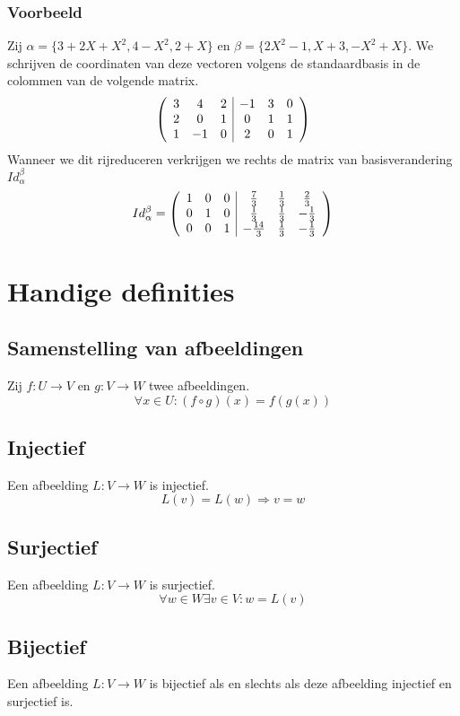 \documentclass[lineaire_algebra_oplossingen.tex]{subfiles}
\begin{document}
\subsubsection*{Voorbeeld}
Zij $\alpha = \{3+2X+X^2,4-X^2,2+X\}$ en $\beta = \{2X^2-1,X+3,-X^2+X\}$.
We schrijven de coordinaten van deze vectoren volgens de standaardbasis in de colommen van de volgende matrix.
\[
\left(
\begin{array}{c c c | c c c}
3 & 4 & 2 & -1 & 3 & 0\\
2 & 0 & 1 & 0 & 1 & 1\\
1 & -1 & 0 & 2 & 0 & 1\\
\end{array}
\right)
\]
Wanneer we dit rijreduceren verkrijgen we rechts de matrix van basisverandering $Id_\alpha^\beta$
\[
Id_\alpha^\beta =
\left(
\begin{array}{c c c | c c c}
1 & 0 & 0 & \frac{7}{3} & \frac{1}{3} & \frac{2}{3}\\
0 & 1 & 0 & \frac{1}{3} & \frac{1}{3} & -\frac{1}{3}\\
0 & 0 & 1 & -\frac{14}{3} & \frac{1}{3} & -\frac{1}{3}\\
\end{array}
\right)
\]

\section{Handige definities}
\subsection{Samenstelling van afbeeldingen}
\label{samenstelling_van_afbeeldingen}
Zij $f: U \rightarrow V$ en $g: V\rightarrow W$ twee afbeeldingen.
\[
\forall x\in U: (f \circ g)(x) = f(g(x))
\]
\subsection{Injectief}
\label{injectief}
Een afbeelding $L: V \rightarrow W$ is injectief.
\[
L(v) = L(w) \Rightarrow v = w
\]
\subsection{Surjectief}
\label{surjectief}
Een afbeelding $L: V \rightarrow W$ is surjectief.
\[
\forall w \in W \exists v \in V: w=L(v)
\]
\subsection{Bijectief}
\label{bijectief}
Een afbeelding $L: V \rightarrow W$ is bijectief als en slechts als deze afbeelding injectief en surjectief is.
\end{document}
